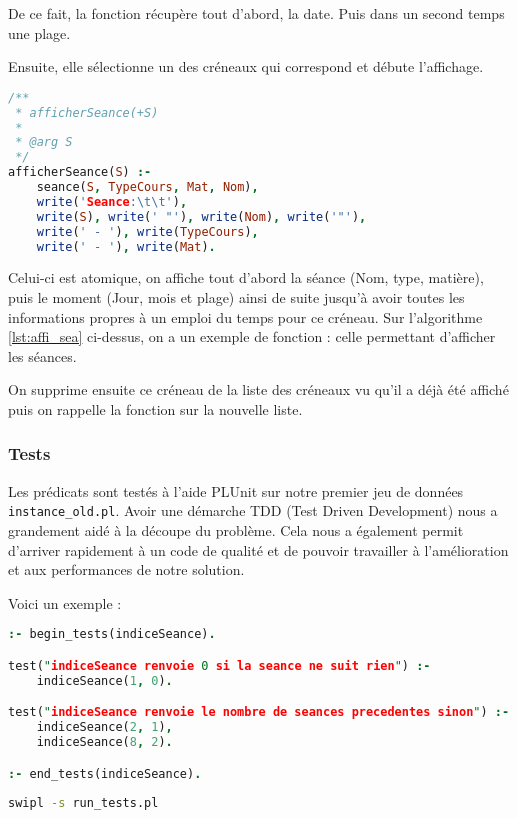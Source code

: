 De ce fait, la fonction récupère tout d'abord, la date. Puis dans un second temps une plage.

Ensuite, elle sélectionne un des créneaux qui correspond et débute l'affichage.

\begin{lstlisting}[language=Prolog, caption=Affichage, captionpos=b,
label={lst:affi_sea}]
/**
 * afficherSeance(+S)
 *
 * @arg S
 */
afficherSeance(S) :-
    seance(S, TypeCours, Mat, Nom),
    write('Seance:\t\t'),
    write(S), write(' "'), write(Nom), write('"'),
    write(' - '), write(TypeCours),
    write(' - '), write(Mat).
\end{lstlisting}

Celui-ci est atomique, on affiche tout d'abord la séance (Nom, type, matière), puis le moment (Jour, mois et plage) ainsi de suite jusqu'à avoir toutes les informations propres à un emploi du temps pour ce créneau.
Sur l'algorithme \ref{lst:affi_sea} ci-dessus, on a un exemple de fonction : celle permettant d'afficher les séances.

On supprime ensuite ce créneau de la liste des créneaux vu qu'il a déjà été affiché puis on rappelle la fonction sur la nouvelle liste.

\subsubsection{Tests}

Les prédicats sont testés à l'aide PLUnit sur notre premier jeu de données
\texttt{instance\_old.pl}. Avoir une démarche TDD (Test Driven Development) nous
a grandement aidé à la découpe du problème. Cela nous a également permit
d'arriver rapidement à un code de qualité et de pouvoir travailler à
l'amélioration et aux performances de notre solution.

Voici un exemple :

\begin{lstlisting}[language=Prolog, caption=Exemple de test, captionpos=b,
label={lst:test}]
:- begin_tests(indiceSeance).

test("indiceSeance renvoie 0 si la seance ne suit rien") :-
    indiceSeance(1, 0).

test("indiceSeance renvoie le nombre de seances precedentes sinon") :-
    indiceSeance(2, 1),
    indiceSeance(8, 2).

:- end_tests(indiceSeance).
\end{lstlisting}

\begin{lstlisting}[language=bash, caption=Lancer les tests, captionpos=b]
swipl -s run_tests.pl
\end{lstlisting}


